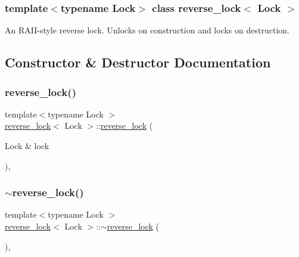 \subsubsection*{template$<$typename Lock$>$\newline
class reverse\+\_\+lock$<$ Lock $>$}

An R\+A\+I\+I-\/style reverse lock. Unlocks on construction and locks on destruction. 

\subsection{Constructor \& Destructor Documentation}
\mbox{\label{classreverse__lock_ad0eb788e8f41452d24dbf32cdf0e6c16}} 
\subsubsection{\texorpdfstring{reverse\+\_\+lock()}{reverse\_lock()}\hspace{0.1cm}{\footnotesize\ttfamily [1/2]}}
{\footnotesize\ttfamily template$<$typename Lock $>$ \\
\mbox{\hyperlink{classreverse__lock}{reverse\+\_\+lock}}$<$ Lock $>$\+::\mbox{\hyperlink{classreverse__lock}{reverse\+\_\+lock}} (\begin{DoxyParamCaption}\item[{Lock \&}]{lock }\end{DoxyParamCaption})\hspace{0.3cm}{\ttfamily [inline]}, {\ttfamily [explicit]}}

\mbox{\label{classreverse__lock_ac778531cac92787864e3f4a84d86da93}} 
\subsubsection{\texorpdfstring{$\sim$reverse\+\_\+lock()}{~reverse\_lock()}}
{\footnotesize\ttfamily template$<$typename Lock $>$ \\
\mbox{\hyperlink{classreverse__lock}{reverse\+\_\+lock}}$<$ Lock $>$\+::$\sim$\mbox{\hyperlink{classreverse__lock}{reverse\+\_\+lock}} (\begin{DoxyParamCaption}{ }\end{DoxyParamCaption})\hspace{0.3cm}{\ttfamily [inline]}, {\ttfamily [noexcept]}}


